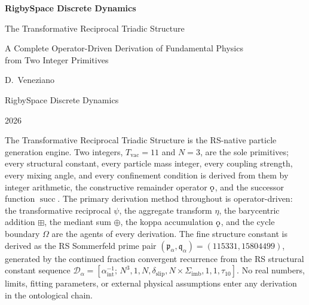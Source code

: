 \documentclass[11pt,letterpaper]{article}
\theoremstyle{plain}
\theoremstyle{definition}
\theoremstyle{remark}
\newcommand{\bplus}{\boxplus}
\newcommand{\med}{\oplus}
\renewcommand{\succ}{\operatorname{succ}}
\newcommand{\koppa}{\mathbin{\text{\rm\k{o}}}}
\newcommand{\Sigimb}{\Sigma_{\mathrm{imb}}}
\newcommand{\dslip}{\delta_{\mathrm{slip}}}
\newcommand{\Tvac}{T_{\mathrm{vac}}}
\newcommand{\tauX}{\tau_{10}}
\newcommand{\aSC}{\alpha^{-1}_{\mathrm{int}}}
\newcommand{\pa}{\mathfrak{p}_\alpha}
\newcommand{\qa}{\mathfrak{q}_\alpha}
\newcommand{\Da}{\mathcal{D}_\alpha}
\begin{document}

\begin{titlepage}
\centering
\vspace*{2cm}
{\Huge\bfseries\color{RSblue}RigbySpace Discrete Dynamics\par}
\vspace{0.5cm}
{\LARGE The Transformative Reciprocal Triadic Structure\par}
\vspace{0.5cm}
{\large A Complete Operator-Driven Derivation of Fundamental Physics\\[0.3cm]
from Two Integer Primitives\par}
\vspace{2cm}
{\large D.\ Veneziano\par}
\vspace{0.5cm}
{\normalsize RigbySpace Discrete Dynamics\par}
\vspace{0.5cm}
{\normalsize 2026\par}
\vspace{2cm}
\begin{minipage}{0.85\textwidth}
\normalsize
The Transformative Reciprocal Triadic Structure is the RS-native
particle generation engine.  Two integers, $\Tvac=11$ and $N=3$, are
the sole primitives; every structural constant, every particle mass
integer, every coupling strength, every mixing angle, and every
confinement condition is derived from them by integer arithmetic,
the constructive remainder operator $\koppa$, and the successor
function $\succ$.  The primary derivation method throughout is
operator-driven: the transformative reciprocal $\psi$, the aggregate
transform $\eta$, the barycentric addition $\bplus$, the mediant sum
$\med$, the koppa accumulation $\koppa$, and the cycle boundary
$\Omega$ are the agents of every derivation.  The fine structure
constant is derived as the RS Sommerfeld prime pair
$(\pa,\qa)=(115331,15804499)$, generated by the continued fraction
convergent recurrence from the RS structural constant sequence
$\Da=[\aSC;\,N^3,1,N,\dslip,N\times\Sigimb,1,1,\tauX]$.  No real
numbers, limits, fitting parameters, or external physical assumptions
enter any derivation in the ontological chain.
\end{minipage}
\end{titlepage}

\tableofcontents
\newpage

\end{document}
